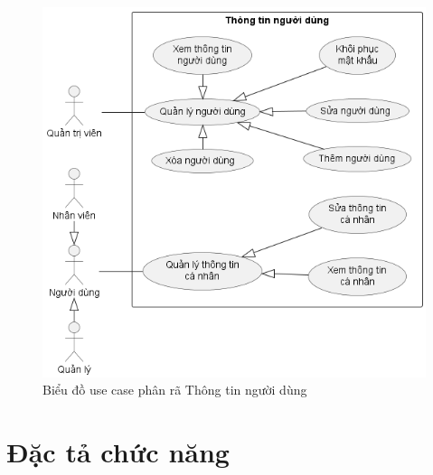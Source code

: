 \documentclass[../DoAn.tex]{subfiles}
\begin{document}
\begin{figure}[H]
    \centering
    \includegraphics[width=\textwidth]{Hinhve/usecases/User}
    \caption{Biểu đồ use case phân rã Thông tin người dùng}
    \label{fig:uc-user}
\end{figure}
\break

\section{Đặc tả chức năng}
\label{section:uc-specification}
\end{document}
